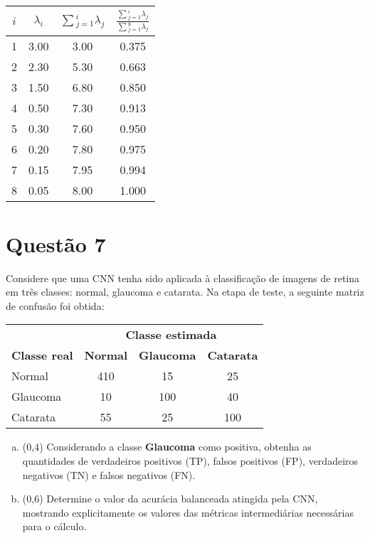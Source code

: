 \documentclass[final,3p]{elsarticle}
\numberwithin{equation}{section}
\begin{document}
        \begin{table}[H]
            \centering
            \begin{tabular}{c c c c}
                \toprule
                \textbf{$i$} & \textbf{$\lambda{}_i$} & \textbf{$\sum{}_{j=1}^i\lambda{}_j$} & \textbf{$\frac{\sum{}_{j=1}^i\lambda{}_j}{\sum{}_{j=1}^8\lambda{}_j}$} \\
                \midrule
                1 & 3.00 & 3.00 & 0.375 \\
                2 & 2.30 & 5.30 & 0.663 \\
                3 & 1.50 & 6.80 & 0.850 \\
                4 & 0.50 & 7.30 & 0.913 \\
                5 & 0.30 & 7.60 & 0.950 \\
                6 & 0.20 & 7.80 & 0.975 \\
                7 & 0.15 & 7.95 & 0.994 \\
                8 & 0.05 & 8.00 & 1.000 \\
                \bottomrule
            \end{tabular}
        \end{table}


\section{Questão 7}

    Considere que uma CNN tenha sido aplicada à classificação de imagens de retina em três classes: normal, glaucoma e catarata. Na etapa de teste, a seguinte matriz de confusão foi obtida:

    \begin{table}[H]
        \centering
        \begin{tabular}{l c c c}
            \toprule
             & \multicolumn{3}{c}{\textbf{Classe estimada}} \\
            \textbf{Classe real} & \textbf{Normal} & \textbf{Glaucoma} & \textbf{Catarata} \\
            \midrule
            Normal & 410 & 15 & 25 \\
            Glaucoma & 10 & 100 & 40 \\
            Catarata & 55 & 25 & 100 \\
            \bottomrule
        \end{tabular}
    \end{table}

    \begin{enumerate}[(a)]
        \item (0,4) Considerando a classe \textbf{Glaucoma} como positiva, obtenha as quantidades de verdadeiros positivos (TP), falsos positivos (FP), verdadeiros negativos (TN) e falsos negativos (FN).
        \item (0,6) Determine o valor da acurácia balanceada atingida pela CNN, mostrando explicitamente os valores das métricas intermediárias necessárias para o cálculo.
    \end{enumerate}
\end{document}
